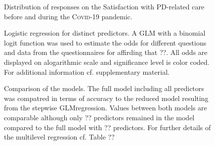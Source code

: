 \documentclass{bmcart}
\begin{document}
\begin{backmatter}
\begin{figure}[h!]

\caption{Distribution of responses on the Satisfaction with PD-related care before and during the \textsc{Covid}-19 pandemic.}
\end{figure}
		
\begin{figure}[h!]

\caption{Logistic regression for distinct predictors. A \ac{GLM} with a binomial logit function was used to estimate the odds for different questions and data from the questionnaires for affirding that ??. All odds are displayed on alogarithmic scale and significance level is color coded. For additional information cf. supplementary material.}
\end{figure}

\begin{figure}[h!]

\caption{Comparison of the models. The full model including all predictors was compatred in terms of accuracy to the reduced model resulting from the stepwise \ac{GLM}regression. Values between both models are comparable although only ?? predictors remained in the model compared to the full model with ?? predictors. For further details of the multilevel regression cf. Table ??}
\end{figure}


		

\end{backmatter}
\end{document}
